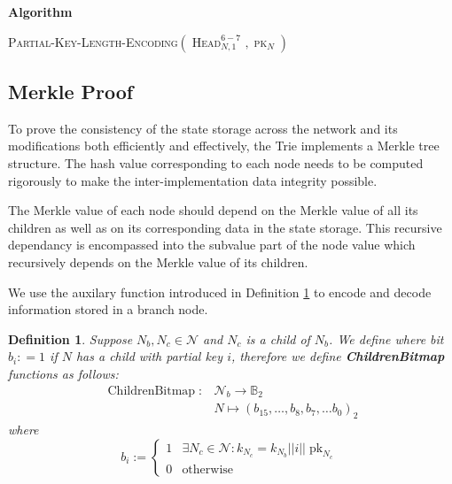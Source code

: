 \documentclass{book}
\newcommand{\assign}{:=}
\newcommand{\tmname}[1]{\textsc{#1}}
\newcommand{\tmop}[1]{\ensuremath{\operatorname{#1}}}
\newcommand{\tmstrong}[1]{\textbf{#1}}
\newcommand{\tmtextbf}[1]{{\bfseries{#1}}}
\newcommand{\tmtextsc}[1]{{\scshape{#1}}}
\newcommand{\tmtextup}[1]{{\upshape{#1}}}
\newenvironment{tmindent}{\begin{tmparmod}{1.5em}{0pt}{0pt}}{\end{tmparmod}}
\newenvironment{tmparmod}[3]{\begin{list}{}{\setlength{\topsep}{0pt}\setlength{\leftmargin}{#1}\setlength{\rightmargin}{#2}\setlength{\parindent}{#3}\setlength{\listparindent}{\parindent}\setlength{\itemindent}{\parindent}\setlength{\parsep}{\parskip}} \item[]}{\end{list}}
\newenvironment{tmparsep}[1]{\begingroup\setlength{\parskip}{#1}}{\endgroup}
\newcounter{tmcounter}
\newcommand{\custombinding}[1]{%
  \setcounter{tmcounter}{#1}%
  \addtocounter{tmcounter}{-1}%
  \refstepcounter{tmcounter}}
\newtheorem{definition}{Definition}
\providecommand{\tmname}[1]{\tmtextsc{#1}}
\providecommand{\tmop}[1]{\ensuremath{\mathrm{#1}}}
\providecommand{\tmstrong}[1]{\tmtextbf{#1}}
\providecommand{\tmtextbf}[1]{\tmtextbf{#1}}
\newtheorem{definition}{Definition}
\begin{document}
\custombinding{2}{\noindent}\begin{tmparmod}{0pt}{0pt}{0em}%
  \begin{tmparsep}{0em}%
    \tmtextbf{Algorithm \tmtextup{2}}{\smallskip}
    
    \begin{tmindent}
      \label{algo-pk-length}{\tmname{Partial-Key-Length-Encoding$(\tmop{Head}_{N,
      1}^{6 - 7}_{}, \tmop{pk}_N)$}}
    \end{tmindent}
  \end{tmparsep}
\end{tmparmod}{\medskip}

\subsection{Merkle Proof}\label{sect-merkl-proof}

To prove the consistency of the state storage across the network and its
modifications both efficiently and effectively, the Trie implements a Merkle
tree structure. The hash value corresponding to each node needs to be computed
rigorously to make the inter-implementation data integrity possible.

The Merkle value of each node should depend on the Merkle value of all its
children as well as on its corresponding data in the state storage. This
recursive dependancy is encompassed into the subvalue part of the node value
which recursively depends on the Merkle value of its children.

We use the auxilary function introduced in Definition
\ref{defn-children-bitmap} to encode and decode information stored in a branch
node.

\begin{definition}
  \label{defn-children-bitmap}Suppose $N_b, N_c \in \mathcal{N}$ and $N_c$ is
  a child of $N_b$. We define where bit $b_i : = 1$ if $N$ has a child with
  partial key $i$, therefore we define {\tmstrong{ChildrenBitmap}} functions
  as follows:
  \[ \begin{array}{cc}
       \tmop{ChildrenBitmap} : & \mathcal{N}_b \rightarrow \mathbb{B}_2\\
       & N \mapsto (b_{15}, \ldots, b_8, b_7, \ldots b_0)_2
     \end{array} \]
  where
  \[ b_i \assign \left\{ \begin{array}{cc}
       1 & \exists N_c \in \mathcal{N}: k_{N_c} = k_{N_b} | | i | |
       \tmop{pk}_{N_c}\\
       0 & \text{otherwise}
     \end{array} \right. \]
\end{definition}
\end{document}
